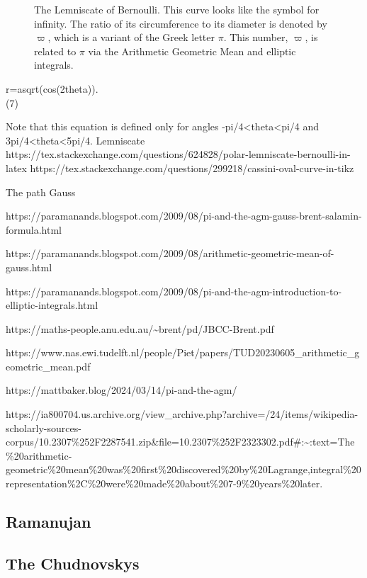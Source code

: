 \documentclass[
  a4paper,
]{article}
\begin{document}
\begin{figure}
\centering

\caption{The Lemniscate of Bernoulli. This curve looks like the symbol
for infinity. The ratio of its circumference to its diameter is denoted
by \(\varpi\), which is a variant of the Greek letter \(\pi\). This
number, \(\varpi\), is related to \(\pi\) via the Arithmetic Geometric
Mean and elliptic integrals.}\label{fig:lemniscate}
\end{figure}

r=asqrt(cos(2theta)).\\
(7)

Note that this equation is defined only for angles
-pi/4\textless theta\textless pi/4 and
3pi/4\textless theta\textless5pi/4. Lemniscate
https://tex.stackexchange.com/questions/624828/polar-lemniscate-bernoulli-in-latex
https://tex.stackexchange.com/questions/299218/cassini-oval-curve-in-tikz

The path Gauss

https://paramanands.blogspot.com/2009/08/pi-and-the-agm-gauss-brent-salamin-formula.html

https://paramanands.blogspot.com/2009/08/arithmetic-geometric-mean-of-gauss.html

https://paramanands.blogspot.com/2009/08/pi-and-the-agm-introduction-to-elliptic-integrals.html

https://maths-people.anu.edu.au/\textasciitilde brent/pd/JBCC-Brent.pdf

https://www.nas.ewi.tudelft.nl/people/Piet/papers/TUD20230605\_arithmetic\_geometric\_mean.pdf

https://mattbaker.blog/2024/03/14/pi-and-the-agm/

https://ia800704.us.archive.org/view\_archive.php?archive=/24/items/wikipedia-scholarly-sources-corpus/10.2307\%252F2287541.zip\&file=10.2307\%252F2323302.pdf\#:\textasciitilde:text=The\%20arithmetic-geometric\%20mean\%20was\%20first\%20discovered\%20by\%20Lagrange,integral\%20representation\%2C\%20were\%20made\%20about\%207-9\%20years\%20later.

\subsection{Ramanujan}\label{ramanujan}

\subsection{The Chudnovskys}\label{the-chudnovskys}
\end{document}
